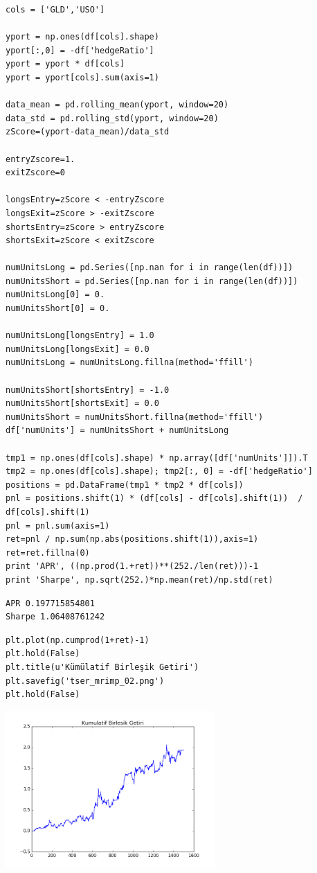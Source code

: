 \documentclass[12pt,fleqn]{article}\usepackage{../../common}
\begin{document}
\begin{verbatim}
cols = ['GLD','USO']

yport = np.ones(df[cols].shape)
yport[:,0] = -df['hedgeRatio']
yport = yport * df[cols]
yport = yport[cols].sum(axis=1)

data_mean = pd.rolling_mean(yport, window=20)
data_std = pd.rolling_std(yport, window=20)
zScore=(yport-data_mean)/data_std

entryZscore=1.
exitZscore=0

longsEntry=zScore < -entryZscore
longsExit=zScore > -exitZscore
shortsEntry=zScore > entryZscore
shortsExit=zScore < exitZscore

numUnitsLong = pd.Series([np.nan for i in range(len(df))])
numUnitsShort = pd.Series([np.nan for i in range(len(df))])
numUnitsLong[0] = 0.
numUnitsShort[0] = 0.

numUnitsLong[longsEntry] = 1.0
numUnitsLong[longsExit] = 0.0
numUnitsLong = numUnitsLong.fillna(method='ffill')

numUnitsShort[shortsEntry] = -1.0
numUnitsShort[shortsExit] = 0.0
numUnitsShort = numUnitsShort.fillna(method='ffill')
df['numUnits'] = numUnitsShort + numUnitsLong

tmp1 = np.ones(df[cols].shape) * np.array([df['numUnits']]).T
tmp2 = np.ones(df[cols].shape); tmp2[:, 0] = -df['hedgeRatio']
positions = pd.DataFrame(tmp1 * tmp2 * df[cols])
pnl = positions.shift(1) * (df[cols] - df[cols].shift(1))  / df[cols].shift(1)
pnl = pnl.sum(axis=1)
ret=pnl / np.sum(np.abs(positions.shift(1)),axis=1)
ret=ret.fillna(0)
print 'APR', ((np.prod(1.+ret))**(252./len(ret)))-1
print 'Sharpe', np.sqrt(252.)*np.mean(ret)/np.std(ret)
\end{verbatim}

\begin{verbatim}
APR 0.197715854801
Sharpe 1.06408761242
\end{verbatim}

\begin{verbatim}
plt.plot(np.cumprod(1+ret)-1)
plt.hold(False)
plt.title(u'Kümülatif Birleşik Getiri')
plt.savefig('tser_mrimp_02.png')
plt.hold(False)
\end{verbatim}

\includegraphics[height=6cm]{tser_mrimp_02.png}
\end{document}

